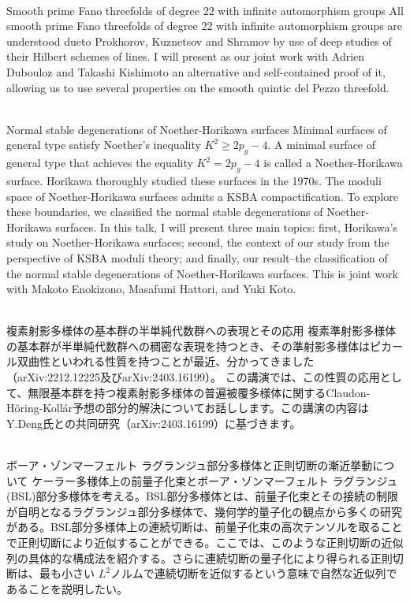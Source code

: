 \documentclass[dvipdfmx,a4paper,12pt]{article}
\theoremstyle{plain} %
\theoremstyle{definition} %
\begin{document}
\vskip3mm
\\
Smooth prime Fano threefolds of degree 22 with infinite automorphism groups 
\vskip3mm
All smooth prime Fano threefolds of degree 22 with infinite automorphism groups
are understood dueto Prokhorov, Kuznetsov and Shramov by use of deep studies of
their Hilbert schemes of lines. I will present as our joint work with
Adrien Dubouloz and Takashi Kishimoto an alternative and self-contained
proof of it, allowing us to use several properties on
the smooth quintic del Pezzo threefold. 

\vskip8mm

\\
Normal stable degenerations of Noether-Horikawa surfaces
\vskip3mm
Minimal surfaces of general type satisfy Noether's inequality $K^2 \geq 2p_g - 4$. A minimal surface of general type that achieves the equality $K^2 = 2p_g - 4$ is called a Noether-Horikawa surface. Horikawa thoroughly studied these surfaces in the 1970s.
The moduli space of Noether-Horikawa surfaces admits a KSBA compactification. To explore these boundaries, we classified the normal stable degenerations of Noether-Horikawa surfaces.
In this talk, I will present three main topics: first, Horikawa's study on Noether-Horikawa surfaces; second, the context of our study from the perspective of KSBA moduli theory; and finally, our result--the classification of the normal stable degenerations of Noether-Horikawa surfaces.
This is joint work with Makoto Enokizono, Masafumi Hattori, and Yuki Koto.
\vskip8mm
\newpage

\\
複素射影多様体の基本群の半単純代数群への表現とその応用
\vskip3mm
複素準射影多様体の基本群が半単純代数群への稠密な表現を持つとき、その準射影多様体はピカール双曲性といわれる性質を持つことが最近、分かってきました（arXiv:2212.12225及びarXiv:2403.16199）。
この講演では、この性質の応用として、無限基本群を持つ複素射影多様体の普遍被覆多様体に関するClaudon-H\"oring-Koll\'ar予想の部分的解決についてお話しします。この講演の内容はY.Deng氏との共同研究（arXiv:2403.16199）に基づきます。
\vskip8mm


\\
ボーア・ゾンマーフェルト ラグランジュ部分多様体と正則切断の漸近挙動について
\vskip3mm
ケーラー多様体上の前量子化束とボーア・ゾンマーフェルト ラグランジュ(BSL)部分多様体を考える。BSL部分多様体とは、前量子化束とその接続の制限が自明となるラグランジュ部分多様体で、幾何学的量子化の観点から多くの研究がある。BSL部分多様体上の連続切断は、前量子化束の高次テンソルを取ることで正則切断により近似することができる。ここでは、このような正則切断の近似列の具体的な構成法を紹介する。さらに連続切断の量子化により得られる正則切断は、最も小さい $L^2$ノルムで連続切断を近似するという意味で自然な近似列であることを説明したい。
\vskip8mm
\end{document}
